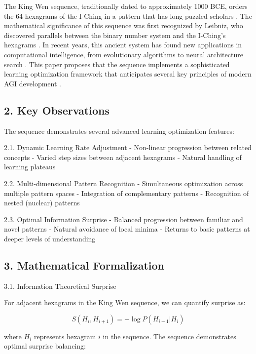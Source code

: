 \documentclass{article}
\begin{document}
The King Wen sequence, traditionally dated to approximately 1000 BCE,
orders the 64 hexagrams of the I-Ching in a pattern that has long
puzzled scholars \cite{smith2012iching}. The mathematical significance of this 
sequence was first recognized by Leibniz, who discovered parallels between 
the binary number system and the I-Ching's hexagrams \cite{leibniz1703binary}. 
In recent years, this ancient system has found new applications in computational 
intelligence, from evolutionary algorithms \cite{chen2016iching} to neural 
architecture search \cite{zhang2021asnas}. This paper proposes that the 
sequence implements a sophisticated learning optimization framework that 
anticipates several key principles of modern AGI development 
\cite{hutter2007universalalgorithmicintelligencemathematical}.

\hypertarget{key-observations}{%
\subsection{2. Key Observations}\label{key-observations}}

The sequence demonstrates several advanced learning optimization
features:

2.1. Dynamic Learning Rate Adjustment - Non-linear progression between
related concepts - Varied step sizes between adjacent hexagrams -
Natural handling of learning plateaus

2.2. Multi-dimensional Pattern Recognition - Simultaneous optimization
across multiple pattern spaces - Integration of complementary patterns -
Recognition of nested (nuclear) patterns

2.3. Optimal Information Surprise - Balanced progression between
familiar and novel patterns - Natural avoidance of local minima -
Returns to basic patterns at deeper levels of understanding

\subsection{3. Mathematical Formalization}\label{mathematical-formalization}

3.1. Information Theoretical Surprise

For adjacent hexagrams in the King Wen sequence, we can quantify surprise as:

\begin{equation}
S(H_i, H_{i+1}) = -\log P(H_{i+1}|H_i)
\end{equation}

where $H_i$ represents hexagram $i$ in the sequence. The sequence demonstrates 
optimal surprise balancing:
\end{document}

